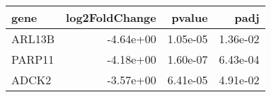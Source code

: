 \begin{tabular}{lrrr}
\toprule
  gene &  log2FoldChange &   pvalue &     padj \\
\midrule
ARL13B &       -4.64e+00 & 1.05e-05 & 1.36e-02 \\
PARP11 &       -4.18e+00 & 1.60e-07 & 6.43e-04 \\
 ADCK2 &       -3.57e+00 & 6.41e-05 & 4.91e-02 \\
\bottomrule
\end{tabular}
